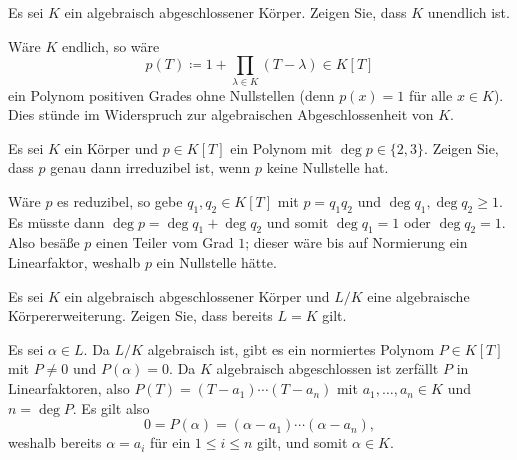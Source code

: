 \begin{question}[subtitle = Unendlichkeit algebraisch abgeschlossener Körper]
  Es sei $K$ ein algebraisch abgeschlossener Körper.
  Zeigen Sie, dass $K$ unendlich ist.
\end{question}


\begin{solution}
  Wäre $K$ endlich, so wäre
  \[
              p(T)
    \coloneqq 1 + \prod_{\lambda \in K} (T - \lambda)
    \in       K[T]
  \]
  ein Polynom positiven Grades ohne Nullstellen (denn $p(x) = 1$ für alle $x \in K$).
  Dies stünde im Widerspruch zur algebraischen Abgeschlossenheit von $K$.
\end{solution}


\begin{question}[subtitle = Irreduziblität quadratischer und kubischer Polynome]
  \label{question: irreducibility of quadratic and cubic polynomials}
  Es sei $K$ ein Körper und $p \in K[T]$ ein Polynom mit $\deg p \in \{2, 3\}$.
  Zeigen Sie, dass $p$ genau dann irreduzibel ist, wenn $p$ keine Nullstelle hat.
\end{question}


\begin{solution}
  Wäre $p$ es reduzibel, so gebe $q_1, q_2 \in K[T]$ mit $p = q_1 q_2$ und $\deg q_1, \deg q_2 \geq 1$.
  Es müsste dann $\deg p = \deg q_1 + \deg q_2$ und somit $\deg q_1 = 1$ oder $\deg q_2 = 1$.
  Also besäße $p$ einen Teiler vom Grad $1$;
  dieser wäre bis auf Normierung ein Linearfaktor, weshalb $p$ ein Nullstelle hätte.
\end{solution}


\begin{question}[subtitle = Abgeschlossenheit algebraischer abgeschlossener Körper]
  \label{question: algebraically closed fields have no nontrivial algebraic extensions}
  Es sei $K$ ein algebraisch abgeschlossener Körper und $L/K$ eine algebraische Körpererweiterung.
  Zeigen Sie, dass bereits $L = K$ gilt.
\end{question}


\begin{solution}
  Es sei $\alpha \in L$.
  Da $L/K$ algebraisch ist, gibt es ein normiertes Polynom $P \in K[T]$ mit $P \neq 0$ und $P(\alpha) = 0$.
  Da $K$ algebraisch abgeschlossen ist zerfällt $P$ in Linearfaktoren, also $P(T) = (T - a_1) \dotsm (T - a_n)$ mit $a_1, \dotsc, a_n \in K$ und $n = \deg P$.
  Es gilt also
  \[
      0
    = P(\alpha)
    = (\alpha - a_1) \dotsm (\alpha - a_n),
  \]
  weshalb bereits $\alpha = a_i$ für ein $1 \leq i \leq n$ gilt, und somit $\alpha \in K$.
\end{solution}


